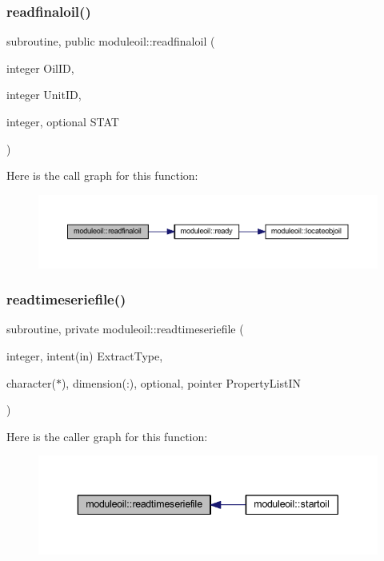 \subsubsection{\texorpdfstring{readfinaloil()}{readfinaloil()}}
{\footnotesize\ttfamily subroutine, public moduleoil\+::readfinaloil (\begin{DoxyParamCaption}\item[{integer}]{Oil\+ID,  }\item[{integer}]{Unit\+ID,  }\item[{integer, optional}]{S\+T\+AT }\end{DoxyParamCaption})}

Here is the call graph for this function\+:\nopagebreak
\begin{figure}[H]
\begin{center}
\leavevmode
\includegraphics[width=350pt]{namespacemoduleoil_aaa3a2256f78ae25e941bfe7a937c796b_cgraph}
\end{center}
\end{figure}
\mbox{\label{namespacemoduleoil_add8d9c35ee53aee7829af9a0f4b3dff4}} 
\subsubsection{\texorpdfstring{readtimeseriefile()}{readtimeseriefile()}}
{\footnotesize\ttfamily subroutine, private moduleoil\+::readtimeseriefile (\begin{DoxyParamCaption}\item[{integer, intent(in)}]{Extract\+Type,  }\item[{character($\ast$), dimension(\+:), optional, pointer}]{Property\+List\+IN }\end{DoxyParamCaption})\hspace{0.3cm}{\ttfamily [private]}}

Here is the caller graph for this function\+:\nopagebreak
\begin{figure}[H]
\begin{center}
\leavevmode
\includegraphics[width=343pt]{namespacemoduleoil_add8d9c35ee53aee7829af9a0f4b3dff4_icgraph}
\end{center}
\end{figure}
\mbox{\label{namespacemoduleoil_a16763a360a31b49d4f67bbba295472a5}} 
